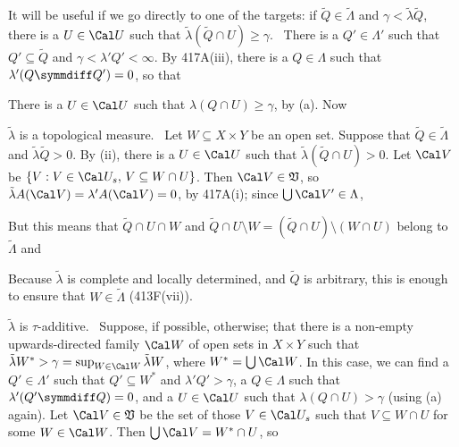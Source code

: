 {\medskip

 It will be useful if we go directly to one of the
targets:  if $\tilde Q\in\tilde\Lambda$ and
$\gamma<\tilde\lambda\tilde Q$, there is
a $U\in\Cal U$ such that $\tilde\lambda(\tilde Q\cap U)\ge\gamma$.   \Prf\
There is a $Q'\in\Lambda'$ such that $Q'\subseteq\tilde Q$ and
$\gamma<\lambda'Q'<\infty$.   By 417A(iii), there is a $Q\in\Lambda$
such that $\lambda'(Q\symmdiff Q')=0$, so that


\noindent There is a $U\in\Cal U$ such that
$\lambda(Q\cap U)\ge\gamma$, by (a).   Now


\medskip

 $\tilde\lambda$ is a topological measure.   \Prf\ Let
$W\subseteq X\times Y$ be an open set.   Suppose that
$\tilde Q\in\tilde\Lambda$
and $\tilde\lambda\tilde Q>0$.   By (ii), there is a $U\in\Cal U$ such that
$\tilde\lambda(\tilde Q\cap U)>0$.
Let $\Cal V$ be $\{V:V\in\Cal U_s,\,V\subseteq W\cap U\}$.   Then
$\Cal V\in\frak V$, so $\tilde\lambda A(\Cal V)=\lambda'A(\Cal V)=0$, by
417A(i); since $\bigcup\Cal V'\in\Lambda$,


\noindent But this means that $\tilde Q\cap U\cap W$ and
$\tilde Q\cap U\setminus W=(\tilde Q\cap U)\setminus(W\cap U)$ belong to
$\tilde\Lambda$ and


\noindent Because $\tilde\lambda$ is complete and locally determined,
and $\tilde Q$ is arbitrary, this is enough to ensure that
$W\in\tilde\Lambda$ (413F(vii)).\ \Qed

\medskip

 $\tilde\lambda$ is $\tau$-additive.   \Prf\Quer\
Suppose, if possible, otherwise;  that there is a non-empty
upwards-directed family $\Cal W$ of open sets in $X\times Y$ such that
$\tilde\lambda W^*>\gamma=\sup_{W\in\Cal W}\tilde\lambda W$, where
$W^*=\bigcup\Cal W$.
In this case, we can find a $Q'\in\Lambda'$ such that
$Q'\subseteq W^*$ and $\lambda'Q'>\gamma$, a $Q\in\Lambda$ such that
$\lambda'(Q'\symmdiff Q)=0$, and a $U\in\Cal U$ such that
$\lambda(Q\cap U)>\gamma$ (using (a) again).   Let
$\Cal V\in\frak V$ be the set of those
$V\in\Cal U_s$ such that $V\subseteq W\cap U$ for some $W\in\Cal W$.
Then $\bigcup\Cal V=W^*\cap U$, so

}
